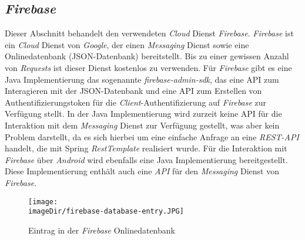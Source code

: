 \subsection{\emph{Firebase}}
Dieser Abschnitt behandelt den verwendeten \emph{Cloud} Dienst \emph{Firebase}. \emph{Firebase} ist ein \emph{Cloud} Dienst von \emph{Google}, der einen \emph{Messaging} Dienst sowie eine Onlinedatenbank (JSON-Datenbank) bereitstellt. Bis zu einer gewissen Anzahl von \emph{Requests} ist dieser Dienst kostenlos zu verwenden.  
\newline
\newline
Für \emph{Firebase} gibt es eine Java Implementierung das sogenannte \emph{firebase-admin-sdk}, das eine API zum Interagieren mit der JSON-Datenbank und eine API zum Erstellen von Authentifizierungstoken für die \emph{Client}-Authentifizierung auf \emph{Firebase} zur Verfügung stellt. In der Java Implementierung wird zurzeit keine API für die Interaktion mit dem \emph{Messaging} Dienst zur Verfügung gestellt, was aber kein Problem darstellt, da es sich hierbei um eine einfache Anfrage an eine \emph{REST-API} handelt, die mit Spring \emph{RestTemplate} realisiert wurde.
\newline
\newline
Für die Interaktion mit \emph{Firebase} über \emph{Android} wird ebenfalls eine Java Implementierung bereitgestellt. Diese Implementierung enthält auch eine \emph{API} für den \emph{Messaging} Dienst von \emph{Firebase}.
\newline
\newline
\begin{figure}[h]
	\centering
	\texttt{[image: \\imageDir/firebase-database-entry.JPG]}
	\caption{Eintrag in der \emph{Firebase} Onlinedatenbank}
	\label{fig:firabse-database}
\end{figure}
